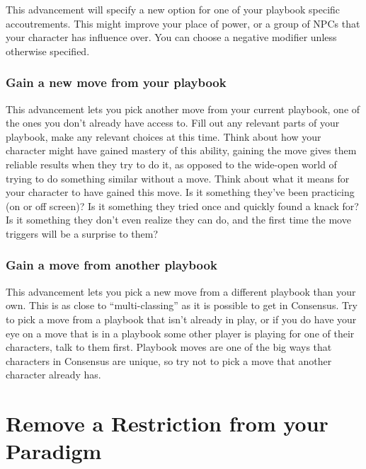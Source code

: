 \documentclass[10pt,twoside,openright]{memoir}
\begin{document}
This advancement will specify a new option for one of your playbook
specific accoutrements. This might improve your place of power, or a
group of NPCs that your character has influence over. You can choose a
negative modifier unless otherwise specified.

\hypertarget{gain-a-new-move-from-your-playbook}{%
\subsubsection{Gain a new move from your
playbook}\label{gain-a-new-move-from-your-playbook}}

This advancement lets you pick another move from your current playbook,
one of the ones you don't already have access to. Fill out any relevant
parts of your playbook, make any relevant choices at this time. Think
about how your character might have gained mastery of this ability,
gaining the move gives them reliable results when they try to do it, as
opposed to the wide-open world of trying to do something similar without
a move. Think about what it means for your character to have gained this
move. Is it something they've been practicing (on or off screen)? Is it
something they tried once and quickly found a knack for? Is it something
they don't even realize they can do, and the first time the move
triggers will be a surprise to them?

\hypertarget{gain-a-move-from-another-playbook}{%
\subsubsection{Gain a move from another
playbook}\label{gain-a-move-from-another-playbook}}

This advancement lets you pick a new move from a different playbook than
your own. This is as close to ``multi-classing'' as it is possible to
get in Consensus. Try to pick a move from a playbook that isn't already
in play, or if you do have your eye on a move that is in a playbook some
other player is playing for one of their characters, talk to them first.
Playbook moves are one of the big ways that characters in Consensus are
unique, so try not to pick a move that another character already has.

\hypertarget{remove-a-restriction-from-your-paradigm}{%
\section{Remove a Restriction from your
Paradigm}\label{remove-a-restriction-from-your-paradigm}}
\end{document}
